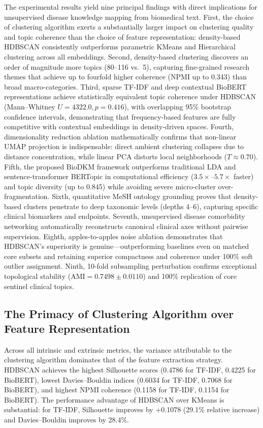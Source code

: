 \documentclass[a4paper,10pt,conference]{IEEEtran}
\begin{document}
The experimental results yield nine principal findings with direct implications for unsupervised disease knowledge mapping from biomedical text. First, the choice of clustering algorithm exerts a substantially larger impact on clustering quality and topic coherence than the choice of feature representation: density-based HDBSCAN consistently outperforms parametric KMeans and Hierarchical clustering across all embeddings. Second, density-based clustering discovers an order of magnitude more topics (80--116 vs.\ 5), capturing fine-grained research themes that achieve up to fourfold higher coherence (NPMI up to 0.343) than broad macro-categories. Third, sparse TF-IDF and deep contextual BioBERT representations achieve statistically equivalent topic coherence under HDBSCAN (Mann--Whitney $U=4322.0, p=0.416$), with overlapping 95\% bootstrap confidence intervals, demonstrating that frequency-based features are fully competitive with contextual embeddings in density-driven spaces. Fourth, dimensionality reduction ablation mathematically confirms that non-linear UMAP projection is indispensable: direct ambient clustering collapses due to distance concentration, while linear PCA distorts local neighborhoods ($T \approx 0.70$). Fifth, the proposed BioDKM framework outperforms traditional LDA and sentence-transformer BERTopic in computational efficiency ($3.5\times$--$5.7\times$ faster) and topic diversity (up to 0.845) while avoiding severe micro-cluster over-fragmentation. Sixth, quantitative MeSH ontology grounding proves that density-based clusters penetrate to deep taxonomic levels (depths 4--6), capturing specific clinical biomarkers and endpoints. Seventh, unsupervised disease comorbidity networking automatically reconstructs canonical clinical axes without pairwise supervision. Eighth, apples-to-apples noise ablation demonstrates that HDBSCAN's superiority is genuine—outperforming baselines even on matched core subsets and retaining superior compactness and coherence under 100\% soft outlier assignment. Ninth, 10-fold subsampling perturbation confirms exceptional topological stability ($\text{AMI} = 0.7498 \pm 0.0110$) and 100\% replication of core sentinel clinical topics.

\subsection{The Primacy of Clustering Algorithm over Feature Representation}

Across all intrinsic and extrinsic metrics, the variance attributable to the clustering algorithm dominates that of the feature extraction strategy. HDBSCAN achieves the highest Silhouette scores (0.4786 for TF-IDF, 0.4225 for BioBERT), lowest Davies--Bouldin indices (0.6034 for TF-IDF, 0.7068 for BioBERT), and highest NPMI coherence (0.1158 for TF-IDF, 0.1154 for BioBERT). The performance advantage of HDBSCAN over KMeans is substantial: for TF-IDF, Silhouette improves by +0.1078 (29.1\% relative increase) and Davies--Bouldin improves by 28.4\%.
\end{document}
